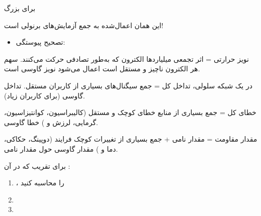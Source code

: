 
 برای  بزرگ

این همان  اعمال‌شده به جمع آزمایش‌های برنولی است!

\begin{itemize}
\tightlist
\item
  تصحیح پیوستگی: 
\end{itemize}



نویز حرارتی = اثر تجمعی میلیاردها الکترون که به‌طور تصادفی حرکت می‌کنند. سهم هر الکترون ناچیز و مستقل است  اعمال می‌شود \lr{\mbox{\ensuremath{\to}}} نویز گاوسی است.


در یک شبکه سلولی، تداخل کل = جمع سیگنال‌های بسیاری از کاربران مستقل.  تداخل \lr{\mbox{\ensuremath{\approx}}} گاوسی (برای کاربران زیاد).


خطای کل = جمع بسیاری از منابع خطای کوچک و مستقل (کالیبراسیون، کوانتیزاسیون، گرمایی، لرزش و )  خطا \lr{\mbox{\ensuremath{\approx}}} گاوسی.


مقدار مقاومت = مقدار نامی + جمع بسیاری از تغییرات کوچک فرایند (دوپینگ، حکاکی، دما و )  مقدار \lr{\mbox{\ensuremath{\approx}}} گاوسی حول مقدار نامی.



برای تقریب  که در آن :

\begin{enumerate}
\def\labelenumi{\arabic{enumi}.}
\tightlist
\item
  ،  را محاسبه کنید
\item
\item
\end{enumerate}

